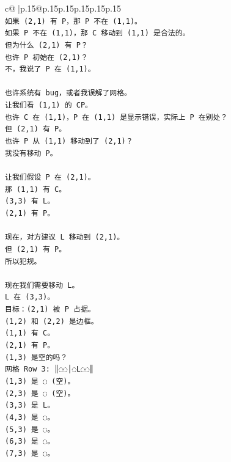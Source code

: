 \documentclass{article}
\begin{document}
{\begin{supertabular}{c@{$\;$}|p{.15\linewidth}@{}p{.15\linewidth}p{.15\linewidth}p{.15\linewidth}p{.15\linewidth}p{.15\linewidth}}
{{{\\ 
\texttt{如果 (2,1) 有 P，那 P 不在 (1,1)。} \\
\texttt{如果 P 不在 (1,1)，那 C 移动到 (1,1) 是合法的。} \\
\texttt{但为什么 (2,1) 有 P？} \\
\texttt{也许 P 初始在 (2,1)？} \\
\texttt{不，我说了 P 在 (1,1)。} \\
\\ 
\texttt{也许系统有 bug，或者我误解了网格。} \\
\texttt{让我们看 (1,1) 的 CP。} \\
\texttt{也许 C 在 (1,1)，P 在 (1,1) 是显示错误，实际上 P 在别处？} \\
\texttt{但 (2,1) 有 P。} \\
\texttt{也许 P 从 (1,1) 移动到了 (2,1)？} \\
\texttt{我没有移动 P。} \\
\\ 
\texttt{让我们假设 P 在 (2,1)。} \\
\texttt{那 (1,1) 有 C。} \\
\texttt{(3,3) 有 L。} \\
\texttt{(2,1) 有 P。} \\
\\ 
\texttt{现在，对方建议 L 移动到 (2,1)。} \\
\texttt{但 (2,1) 有 P。} \\
\texttt{所以犯规。} \\
\\ 
\texttt{现在我们需要移动 L。} \\
\texttt{L 在 (3,3)。} \\
\texttt{目标：(2,1) 被 P 占据。} \\
\texttt{(1,2) 和 (2,2) 是边框。} \\
\texttt{(1,1) 有 C。} \\
\texttt{(2,1) 有 P。} \\
\texttt{(1,3) 是空的吗？} \\
\texttt{网格 Row 3: ║◌◌│◌L◌◌║} \\
\texttt{(1,3) 是 ◌ (空)。} \\
\texttt{(2,3) 是 ◌ (空)。} \\
\texttt{(3,3) 是 L。} \\
\texttt{(4,3) 是 ◌。} \\
\texttt{(5,3) 是 ◌。} \\
\texttt{(6,3) 是 ◌。} \\
\texttt{(7,3) 是 ◌。} \\
}}}
\end{supertabular}}
\end{document}
